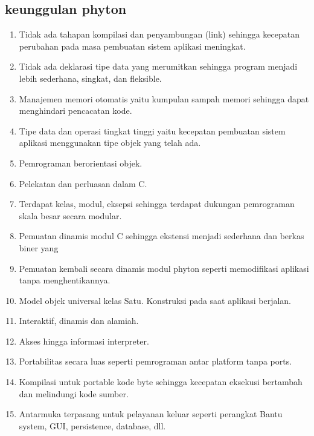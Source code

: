 \subsection{keunggulan phyton}
\begin{enumerate}
    \item Tidak ada tahapan kompilasi dan penyambungan (link) sehingga kecepatan perubahan pada masa pembuatan sistem aplikasi                meningkat. 
    \item Tidak ada deklarasi tipe data yang merumitkan sehingga program menjadi lebih sederhana, singkat, dan fleksible. 
    \item Manajemen memori otomatis yaitu kumpulan sampah memori sehingga dapat menghindari pencacatan kode. 
    \item Tipe data dan operasi tingkat tinggi yaitu kecepatan pembuatan sistem aplikasi menggunakan tipe objek yang telah ada. 
    \item Pemrograman berorientasi objek. 
    \item Pelekatan dan perluasan dalam C.
    \item Terdapat kelas, modul, eksepsi sehingga terdapat dukungan pemrograman skala besar secara modular.
    \item Pemuatan dinamis modul C sehingga ekstensi menjadi sederhana dan berkas biner yang 
    \item Pemuatan kembali secara dinamis modul phyton seperti memodifikasi aplikasi tanpa menghentikannya. 
    \item Model objek universal kelas Satu. Konstruksi pada saat aplikasi berjalan. 
    \item Interaktif, dinamis dan alamiah.\item Akses hingga informasi interpreter. 
    \item Portabilitas secara luas seperti pemrograman antar platform tanpa ports.
    \item Kompilasi untuk portable kode byte sehingga kecepatan eksekusi bertambah dan melindungi kode sumber. 
    \item Antarmuka terpasang untuk pelayanan keluar seperti perangkat Bantu system, GUI, persistence, database, dll. 
\end{enumerate}

